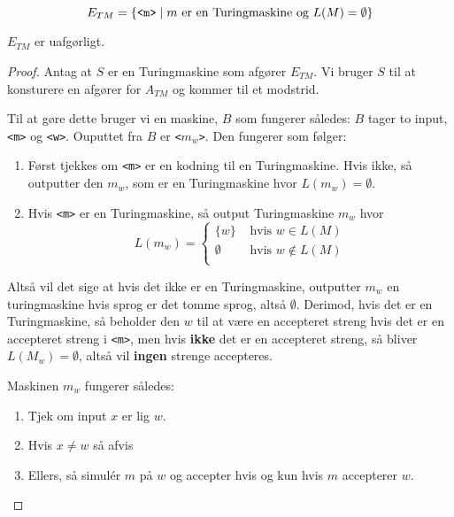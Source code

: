 \begin{equation*}
	E_{TM} = \{\text{\texttt{<m>}} \mid m \text{ er en Turingmaskine og } L(M) = \emptyset\}
\end{equation*}

\begin{theorem}
	\label{teo:etmundecidable}
	$E_{TM}$ er uafgørligt.
\end{theorem}

\begin{proof}
	Antag at $S$ er en Turingmaskine som afgører $E_{TM}$. Vi bruger $S$ til at konsturere en afgører for $A_{TM}$ og kommer til et modstrid.

	Til at gøre dette bruger vi en maskine, $B$ som fungerer således: $B$ tager to input, \texttt{<m>} og \texttt{<w>}. Ouputtet fra $B$  er \texttt{<$m_{w}$>}. Den fungerer som følger:
	\begin{enumerate}
		\item Først tjekkes om \texttt{<m>} er en kodning til en Turingmaskine. Hvis ikke, så outputter den $m_{w}$, som er en Turingmaskine hvor $L(m_{w}) = \emptyset$.
		\item Hvis \texttt{<m>} er en Turingmaskine, så output Turingmaskine $m_{w}$ hvor
		      \begin{equation*}
			      L(m_{w}) =\begin{cases}
				      \{w\}     & \text{ hvis } w \in L(M)    \\
				      \emptyset & \text{ hvis } w \notin L(M) \\
			      \end{cases}
		      \end{equation*}
	\end{enumerate}
	Altså vil det sige at hvis det ikke er en Turingmaskine, outputter $m_{w}$ en turingmaskine hvis sprog er det tomme sprog, altså $\emptyset$. Derimod, hvis det er en Turingmaskine, så beholder den $w$ til at være en accepteret streng hvis det er en accepteret streng i \texttt{<m>}, men hvis \textbf{ikke} det er en accepteret streng, så bliver $L(M_{w}) = \emptyset$, altså vil \textbf{ingen} strenge accepteres.

	Maskinen $m_{w}$ fungerer således:
	\begin{enumerate}
		\item Tjek om input $x$ er lig $w$.
		\item Hvis $x \neq w$ så afvis
		\item Ellers, så simulér $m$ på $w$ og accepter hvis og kun hvis $m$ accepterer $w$.
	\end{enumerate}


\end{proof}

